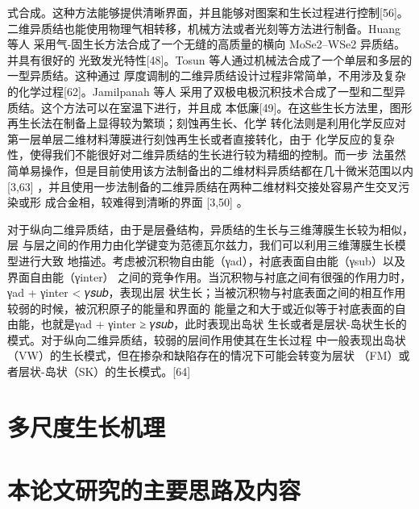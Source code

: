 式合成。这种方法能够提供清晰界面，并且能够对图案和生长过程进行控制[56]。
二维异质结也能使用物理气相转移，机械方法或者光刻等方法进行制备。Huang 等人
采用气-固生长方法合成了一个无缝的高质量的横向 MoSe2–WSe2 异质结。并具有很好的
光致发光特性[48]。Tosun 等人通过机械法合成了一个单层和多层的一型异质结。这种通过
厚度调制的二维异质结设计过程非常简单，不用涉及复杂的化学过程[62]。Jamilpanah 等人
采用了双极电极沉积技术合成了一型和二型异质结。这个方法可以在室温下进行，并且成
本低廉[49]。在这些生长方法里，图形再生长法在制备上显得较为繁琐；刻蚀再生长、化学
转化法则是利用化学反应对第一层单层二维材料薄膜进行刻蚀再生长或者直接转化，由于
化学反应的复杂性，使得我们不能很好对二维异质结的生长进行较为精细的控制。而一步
法虽然简单易操作，但是目前使用该方法制备出的二维材料异质结都在几十微米范围以内
[3,63] ，并且使用一步法制备的二维异质结在两种二维材料交接处容易产生交叉污染或形
成合金相，较难得到清晰的界面 [3,50] 。


对于纵向二维异质结，由于是层叠结构，异质结的生长与三维薄膜生长较为相似，层
与层之间的作用力由化学键变为范德瓦尔兹力，我们可以利用三维薄膜生长模型进行大致
地描述。考虑被沉积物自由能（γad），衬底表面自由能（γsub）以及界面自由能（γinter）
之间的竞争作用。当沉积物与衬底之间有很强的作用力时，γad + γinter < 𝛾𝑠𝑢𝑏，表现出层
状生长；当被沉积物与衬底表面之间的相互作用较弱的时候，被沉积原子的能量和界面的
能量之和大于或近似等于衬底表面的自由能，也就是γad + γinter ≥ 𝛾𝑠𝑢𝑏，此时表现出岛状
生长或者是层状-岛状生长的模式。对于纵向二维异质结，较弱的层间作用使其在生长过程
中一般表现出岛状（VW）的生长模式，但在掺杂和缺陷存在的情况下可能会转变为层状
（FM）或者层状-岛状（SK）的生长模式。[64]
\section{多尺度生长机理}
\section{本论文研究的主要思路及内容}
